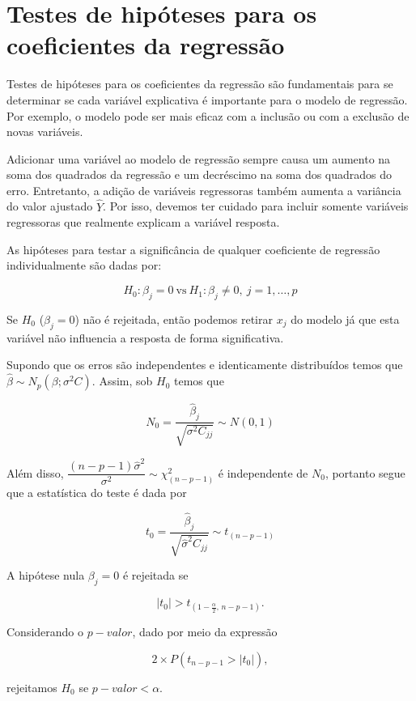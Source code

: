 \documentclass[
]{book}
\begin{document}
\hypertarget{testes-de-hipuxf3teses-para-os-coeficientes-da-regressuxe3o}{%
\section{Testes de hipóteses para os coeficientes da regressão}\label{testes-de-hipuxf3teses-para-os-coeficientes-da-regressuxe3o}}

Testes de hipóteses para os coeficientes da regressão são fundamentais para se determinar se cada variável explicativa é importante para o modelo de regressão. Por exemplo, o modelo pode ser mais eficaz com a inclusão ou com a exclusão de novas variáveis.

Adicionar uma variável ao modelo de regressão sempre causa um aumento na soma dos quadrados da regressão e um decréscimo na soma dos quadrados do erro. Entretanto, a adição de variáveis regressoras também aumenta a variância do valor ajustado \(\widehat{Y}\). Por isso, devemos ter cuidado para incluir somente variáveis regressoras que realmente explicam a variável resposta.

As hipóteses para testar a significância de qualquer coeficiente de regressão individualmente são dadas por:

\[H_0: \beta_j = 0 ~\text{vs}~ H_1: \beta_j \neq 0,~ j=1,\ldots,p\]

Se \(H_0\) (\(\beta_j=0\)) não é rejeitada, então podemos retirar \(x_j\) do modelo já que esta variável não influencia a resposta de forma significativa.

Supondo que os erros são independentes e identicamente distribuídos temos que \(\widehat{\beta}\sim N_p(\beta;\sigma^2C)\). Assim, sob \(H_0\) temos que

\[N_0=\dfrac{\widehat{\beta}_ j}{\sqrt{\sigma^2 C_{jj}}} \sim N(0,1)\]

Além disso, \(\dfrac{(n-p-1)\widehat{\sigma}^2}{\sigma^2} \sim \chi ^2_{(n-p-1)}\) é independente de \(N_0\), portanto segue que a estatística do teste é dada por

\[t_0=\dfrac{\widehat{\beta}_j}{\sqrt{\widehat{\sigma}^2C_{jj}}} \sim t_{(n-p-1)}\]

A hipótese nula \(\beta_j=0\) é rejeitada se

\[|t_0| > t_{(1-\frac{\alpha}{2},\,n-p-1)}.\]

Considerando o \(p-valor\), dado por meio da expressão

\[2\times P\left( t_{n-p-1}> |t_0| \right),\]

rejeitamos \(H_0\) se \(p-valor<\alpha\).
\end{document}
